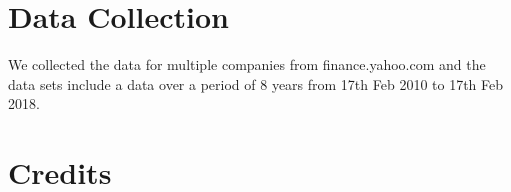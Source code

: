 \documentclass[a4paper]{article}
\begin{document}
\appendix
\section{Data Collection}
We collected the data for multiple companies from finance.yahoo.com and the data sets include a data over a period of 8 years from 17th Feb 2010 to 17th Feb 2018.


\newpage

\section{Credits}

\newpage








\end{document}
